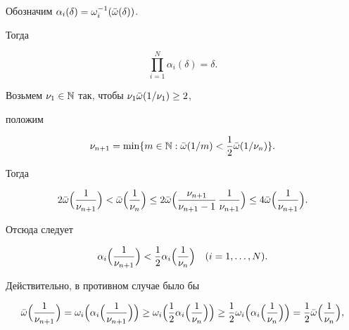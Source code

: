 \begin{pf} Обозначим $\alpha_i(\delta)=\omega_i^{-1}(\Bar\omega(\delta))$. 


Тогда 


\begin{equation} 


\prod^N_{i=1}\alpha_i(\delta)=\delta. 


\end{equation} 


Возьмем $\nu_1\in\Bbb N$ так, чтобы $\nu_1\Bar\omega(1/\nu_1)\ge 2$,


положим 


$$ 


\nu_{n+1}=\min\{m\in\Bbb N:\Bar\omega(1/m)<\frac{1}{2}\Bar\omega(1/\nu_n)\}. 


$$ 


Тогда 


\begin{equation} 


2\Bar\omega\Bigl(\frac{1}{\nu_{n+1}}\Bigr)<\Bar\omega 


\Bigl(\frac{1}{\nu_n}\Bigr) \le 2\Bar\omega 


\Bigl(\frac{\nu_{n+1}}{\nu_{n+1}-1}\,\frac{1}{\nu_{n+1}}\Bigr) 


\le 4\Bar\omega\Bigl(\frac{1}{\nu_{n+1}}\Bigr). 


\end{equation} 


Отсюда следует


\begin{equation} 


\alpha_i\Bigl(\frac{1}{\nu_{n+1}}\Bigr) < \frac{1}{2}\alpha_i 


\Bigl(\frac{1}{\nu_n}\Bigr)\quad (i=1,\dotsc,N). 


\end{equation} 


Действительно, в противном случае было бы 


$$ 


\Bar\omega\Bigl(\frac{1}{\nu_{n+1}}\Bigr)=\omega_i\Bigl(\alpha_i 


\Bigl(\frac{1}{\nu_{n+1}}\Bigr)\Bigr) \ge 


\omega_i\Bigl(\frac{1}{2}\alpha_i\Bigl(\frac{1}{\nu_n}\Bigr)\Bigr) 


\ge \frac{1}{2}\omega_i\Bigl(\alpha_i\Bigl(\frac{1}{\nu_n} 


\Bigr)\Bigr)=\frac{1}{2}\Bar\omega\Bigl(\frac{1}{\nu_n}\Bigr), 


$$ 



\end{pf}
